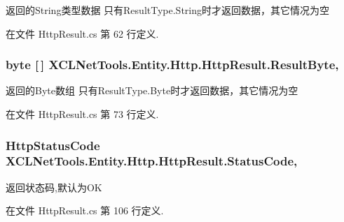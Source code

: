 返回的\-String类型数据 只有\-Result\-Type.\-String时才返回数据，其它情况为空 



在文件 Http\-Result.\-cs 第 62 行定义.

\hypertarget{class_x_c_l_net_tools_1_1_entity_1_1_http_1_1_http_result_aced655e4fc880e3123a3eb5c899a0085}{
\subsubsection[{Result\-Byte}]{\setlength{\rightskip}{0pt plus 5cm}byte \mbox{[}$\,$\mbox{]} X\-C\-L\-Net\-Tools.\-Entity.\-Http.\-Http\-Result.\-Result\-Byte\hspace{0.3cm}{\ttfamily [get]}, {\ttfamily [set]}}}\label{class_x_c_l_net_tools_1_1_entity_1_1_http_1_1_http_result_aced655e4fc880e3123a3eb5c899a0085}


返回的\-Byte数组 只有\-Result\-Type.\-Byte时才返回数据，其它情况为空 



在文件 Http\-Result.\-cs 第 73 行定义.

\hypertarget{class_x_c_l_net_tools_1_1_entity_1_1_http_1_1_http_result_afa7d6f65074d0dc74bca65f6e7d79a79}{
\subsubsection[{Status\-Code}]{\setlength{\rightskip}{0pt plus 5cm}Http\-Status\-Code X\-C\-L\-Net\-Tools.\-Entity.\-Http.\-Http\-Result.\-Status\-Code\hspace{0.3cm}{\ttfamily [get]}, {\ttfamily [set]}}}\label{class_x_c_l_net_tools_1_1_entity_1_1_http_1_1_http_result_afa7d6f65074d0dc74bca65f6e7d79a79}


返回状态码,默认为\-O\-K 



在文件 Http\-Result.\-cs 第 106 行定义.

